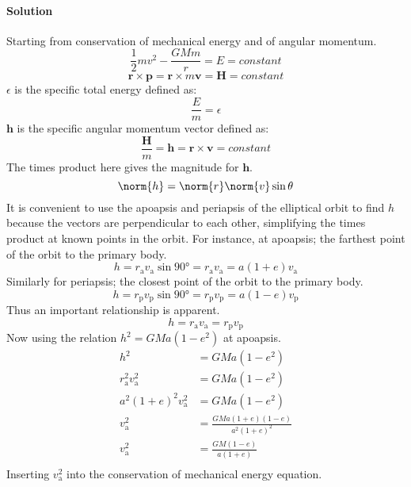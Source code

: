 \documentclass{article}
\begin{document}
{\begin{enumerate}
		\paragraph{Solution} Starting from conservation of mechanical energy and of angular momentum. \\
		\[
			\frac{1}{2} mv^2 - \frac{GMm}{r} = E = constant
		\]
		\[
			\bm{r} \times \bm{p} = \bm{r} \times m\bm{v} = \bm{H} = constant
		\]
		$\epsilon$ is the specific total energy defined as:
		\[
			\frac{E}{m} = \epsilon 
		\]
		$\bm{h}$ is the specific angular momentum vector defined as:
		\[
			\frac{\bm{H}}{m} = \bm{h} = \bm{r} \times \bm{v} = constant
		\]
		The times product here gives the magnitude for $\bm{h}$.
		\[
			\norm{h} = \norm{r}\norm{v} \sin\theta
		\]
		It is convenient to use the apoapsis and periapsis of the elliptical orbit to find $h$ because the vectors are perpendicular to each other, simplifying the times product at known points in the orbit. For instance, at apoapsis; the farthest point of the orbit to the primary body. 
		\[
			h = r_\mathrm{a} v_\mathrm{a} \sin \ang{90} = r_\mathrm{a} v_\mathrm{a} = a(1+e)v_\mathrm{a}
		\]
		Similarly for periapsis; the closest point of the orbit to the primary body.
		\[
			h = r_\mathrm{p} v_\mathrm{p} \sin \ang{90} = r_\mathrm{p} v_\mathrm{p} = a(1-e)v_\mathrm{p}
		\]
		Thus an important relationship is apparent.
		\[
			h = r_\mathrm{a} v_\mathrm{a} = r_\mathrm{p} v_\mathrm{p}
		\]
		Now using the relation $h^2 = GMa(1-e^2)$ at apoapsis.
		\begin{equation*}
			\begin{split}
				h^2 &= GMa(1-e^2) \\
				r^2_\mathrm{a} v^2_\mathrm{a} &= GMa(1-e^2) \\
				a^2(1+e)^2 v^2_\mathrm{a} &= GMa(1-e^2) \\
				v^2_\mathrm{a} &= \frac{GMa(1+e)(1-e)}{a^2(1+e)^2} \\
				v^2_\mathrm{a} &= \frac{GM(1-e)}{a(1+e)} \\
			\end{split}
		\end{equation*}
		Inserting $v^2_\mathrm{a}$ into the conservation of mechanical energy equation.

\end{enumerate}}
\end{document}
